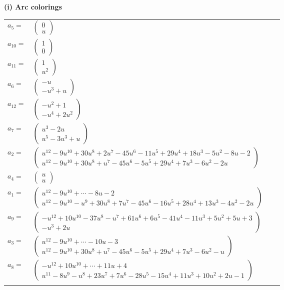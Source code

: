 \documentclass[1p]{elsarticle_modified}
\theoremstyle{definition}
\begin{document}
\flushleft \textbf{(i) Arc colorings}\\
\begin{tabular}{m{7pt} m{180pt} m{7pt} m{180pt} }
\flushright $a_{5}=$&$\begin{pmatrix}0\\u\end{pmatrix}$ \\
\flushright $a_{10}=$&$\begin{pmatrix}1\\0\end{pmatrix}$ \\
\flushright $a_{11}=$&$\begin{pmatrix}1\\u^2\end{pmatrix}$ \\
\flushright $a_{6}=$&$\begin{pmatrix}- u\\- u^3+u\end{pmatrix}$ \\
\flushright $a_{12}=$&$\begin{pmatrix}- u^2+1\\- u^4+2 u^2\end{pmatrix}$ \\
\flushright $a_{7}=$&$\begin{pmatrix}u^3-2 u\\u^5-3 u^3+u\end{pmatrix}$ \\
\flushright $a_{2}=$&$\begin{pmatrix}u^{12}-9 u^{10}+30 u^8+2 u^7-45 u^6-11 u^5+29 u^4+18 u^3-5 u^2-8 u-2\\u^{12}-9 u^{10}+30 u^8+u^7-45 u^6-5 u^5+29 u^4+7 u^3-6 u^2-2 u\end{pmatrix}$ \\
\flushright $a_{4}=$&$\begin{pmatrix}u\\u\end{pmatrix}$ \\
\flushright $a_{1}=$&$\begin{pmatrix}u^{12}-9 u^{10}+\cdots-8 u-2\\u^{12}-9 u^{10}- u^9+30 u^8+7 u^7-45 u^6-16 u^5+28 u^4+13 u^3-4 u^2-2 u\end{pmatrix}$ \\
\flushright $a_{9}=$&$\begin{pmatrix}- u^{12}+10 u^{10}-37 u^8- u^7+61 u^6+6 u^5-41 u^4-11 u^3+5 u^2+5 u+3\\- u^3+2 u\end{pmatrix}$ \\
\flushright $a_{3}=$&$\begin{pmatrix}u^{12}-9 u^{10}+\cdots-10 u-3\\u^{12}-9 u^{10}+30 u^8+u^7-45 u^6-5 u^5+29 u^4+7 u^3-6 u^2- u\end{pmatrix}$ \\
\flushright $a_{8}=$&$\begin{pmatrix}- u^{12}+10 u^{10}+\cdots+11 u+4\\u^{11}-8 u^9- u^8+23 u^7+7 u^6-28 u^5-15 u^4+11 u^3+10 u^2+2 u-1\end{pmatrix}$\\&\end{tabular}
\end{document}
